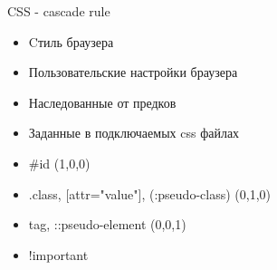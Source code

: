 \begin{frame}{CSS - cascade rule}
 \begin{center}
 \begin{itemize}
 \footnotesize
 \item Cтиль браузера
 \item Пользовательские настройки браузера
 \item Наследованные от предков
 \item Заданные в подключаемых css файлах
 \item \#id (1,0,0)
 \item .class, [attr="value"], (:pseudo-class) (0,1,0)
 \item tag, ::pseudo-element (0,0,1)
 \item !important
 \end{itemize}
 \end{center}
\end{frame}
